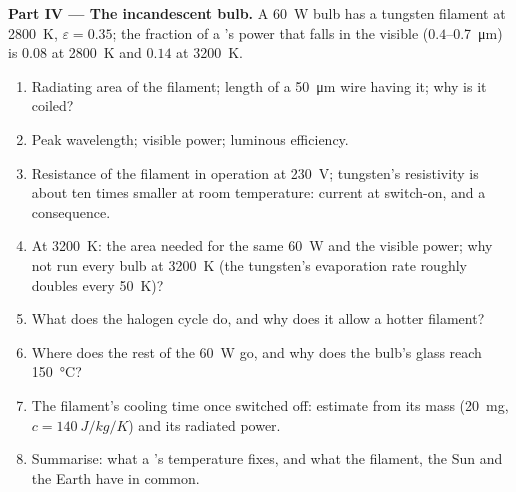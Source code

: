 \begin{problem}
\textbf{Part IV --- The incandescent bulb.}
A \qty{60}{W} bulb has a tungsten filament at \qty{2800}{K},
$\varepsilon = 0.35$; the fraction of a 's power that falls in
the visible ($0.4$--\qty{0.7}{\micro m}) is $0.08$ at \qty{2800}{K} and $0.14$
at \qty{3200}{K}.
\begin{enumerate}[resume]
  \item Radiating area of the filament; length of a \qty{50}{\micro m}
        wire having it; why is it coiled?
  \item Peak wavelength; visible power; luminous efficiency.
  \item Resistance of the filament in operation at \qty{230}{V};
        tungsten's resistivity is about ten times smaller at room
        temperature: current at switch-on, and a consequence.
  \item At \qty{3200}{K}: the area needed for the same \qty{60}{W} and
        the visible power; why not run every bulb at \qty{3200}{K}
        (the tungsten's evaporation rate roughly doubles every
        \qty{50}{K})?
  \item What does the halogen cycle do, and why does it allow a hotter
        filament?
  \item Where does the rest of the \qty{60}{W} go, and why does the
        bulb's glass reach \qty{150}{\celsius}?
  \item The filament's cooling time once switched off: estimate from
        its mass (\qty{20}{mg}, $c = \qty{140}{J/kg/K}$) and its radiated
        power.
  \item Summarise: what a 's temperature fixes, and what
        the filament, the Sun and the Earth have in common.
\end{enumerate}
\end{problem}

